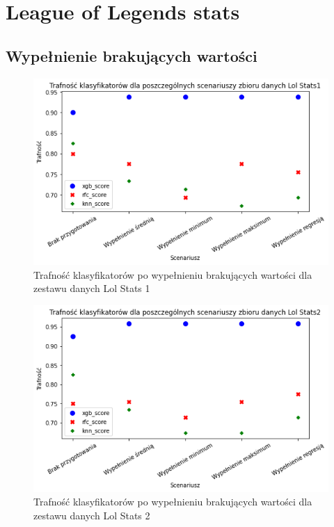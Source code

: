 \documentclass{book}
\begin{document}
\section{League of Legends stats}

\subsection{Wypełnienie brakujących wartości}
\begin{figure}[H]
\centerline{\includegraphics[scale=0.5]{Lol_Stats_1_Wypełnienie_brakujących}}
\centering
\caption{Trafność klasyfikatorów po wypełnieniu brakujących wartości dla zestawu danych Lol Stats 1}
\end{figure}

\begin{figure}[H]
\centerline{\includegraphics[scale=0.5]{Lol_Stats_2_Wypełnienie_brakujących}}
\centering
\caption{Trafność klasyfikatorów po wypełnieniu brakujących wartości dla zestawu danych Lol Stats 2}
\end{figure}
\end{document}
